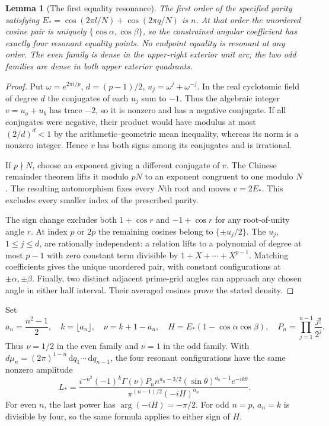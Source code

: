 \documentclass[11pt]{article}
\numberwithin{equation}{section}
\newtheorem{lemma}[theorem]{Lemma}
\theoremstyle{definition}
\newcommand{\dd}{\,\mathrm d}
\begin{document}
\begin{lemma}[The first equality resonance]\label{iso:new:radial:arithmetic}
The first order of the specified parity satisfying
$E_*=\cos(2\pi l/N)+\cos(2\pi q/N)$ is $n$.
At that order the unordered cosine pair is uniquely
$\{\cos\alpha,\cos\beta\}$, so the constrained angular
coefficient has exactly four resonant equality points.
No endpoint equality is resonant at any order.  The even
family is dense in the upper-right exterior unit arc; the
two odd families are dense in both upper exterior quadrants.
\end{lemma}
\begin{proof}
Put $\omega=e^{2\pi i/p}$, $d=(p-1)/2$,
$u_j=\omega^j+\omega^{-j}$.
In the real cyclotomic field of degree $d$ the conjugates of each
$u_j$ sum to $-1$. Thus the algebraic integer $v=u_a+u_b$ has
trace $-2$, so it is nonzero and has a negative conjugate. If all
conjugates were negative, their product would have modulus at most
$(2/d)^d<1$ by the arithmetic--geometric mean inequality, whereas
its norm is a nonzero integer. Hence $v$ has both signs among its
conjugates and is irrational.

If $p\nmid N$, choose an exponent giving a different conjugate
of $v$. The Chinese remainder theorem lifts it modulo $pN$ to an
exponent congruent to one modulo $N$. The resulting automorphism
fixes every $N$th root and moves $v=2E_*$. This excludes every
smaller index of the prescribed parity.

The sign change excludes both $1+\cos r$ and $-1+\cos r$ for
any root-of-unity angle $r$. At index $p$ or $2p$ the remaining
cosines belong to $\{\pm u_j/2\}$. The $u_j$, $1\le j\le d$,
are rationally independent: a relation lifts to a polynomial of
degree at most $p-1$ with zero constant term divisible by
$1+X+\cdots+X^{p-1}$. Matching coefficients gives the unique
unordered pair, with constant configurations at $\pm\alpha,\pm\beta$.
Finally, two distinct adjacent prime-grid angles can approach
any chosen angle in either half interval.  Their averaged
cosines prove the stated density.
\end{proof}

Set
\[
 a_n=\frac{n^2-1}{2},\quad k=\lfloor a_n\rfloor,\quad
 \nu=k+1-a_n,\quad H=E_*(1-\cos\alpha\cos\beta),\quad
 P_n=\prod_{j=1}^{n-1}\frac{j!}{2^j}.
\]
Thus $\nu=1/2$ in the even family and $\nu=1$ in the odd
family. With $d\mu_n=(2\pi)^{1-n}\dd q_1\cdots\dd q_{n-1}$, the four
resonant configurations have the same nonzero amplitude
\begin{equation}\label{iso:new:radial:L}
 L_*=
 \frac{i^{-n^2}(-1)^k\Gamma(\nu)P_n n^{a_n-3/2}
          (\sin\theta)^{a_n-1}e^{-ik\theta}}
      {\pi^{(n-1)/2}(-iH)^{a_n}}.
\end{equation}
For even $n$, the last power has $\arg(-iH)=-\pi/2$.
For odd $n=p$, $a_n=k$ is divisible by four, so the
same formula applies to either sign of $H$.
\end{document}
